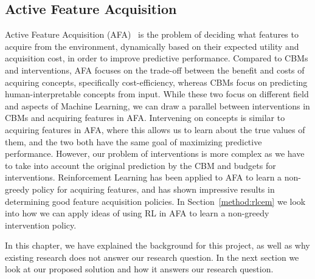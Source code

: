 \subsection{Active Feature Acquisition}\label{background:afa}
Active Feature Acquisition (AFA)~\cite{afa} is the problem of deciding
what features to acquire from the environment, dynamically based
on their expected utility and acquisition cost, in order to 
improve predictive performance. Compared to
CBMs and interventions, AFA focuses on 
the trade-off between the benefit and costs of acquiring concepts,
specifically cost-efficiency, whereas
CBMs focus on predicting human-interpretable concepts 
from input. While these two focus on different field and aspects
of Machine Learning, we can draw a parallel between
interventions in CBMs and acquiring features in AFA.
Intervening on concepts is similar to acquiring features in AFA,
where this allows us to learn about the true values of them,
and the two both have the same goal of maximizing predictive performance.
However, our problem of interventions is more complex as we have to take
into account the original prediction by the CBM and budgets for interventions.
Reinforcement Learning has been applied to AFA to learn a non-greedy
policy for acquiring features, and has shown impressive results
in determining good feature acquisition policies.
In Section~\ref{method:rlcem} we look into how we can apply ideas of using
RL in AFA to learn a non-greedy intervention policy.


In this chapter, we have explained the 
background for this project, as well as why existing research
does not answer our research question. In the next section
we look at our proposed solution and how it answers our research question.

